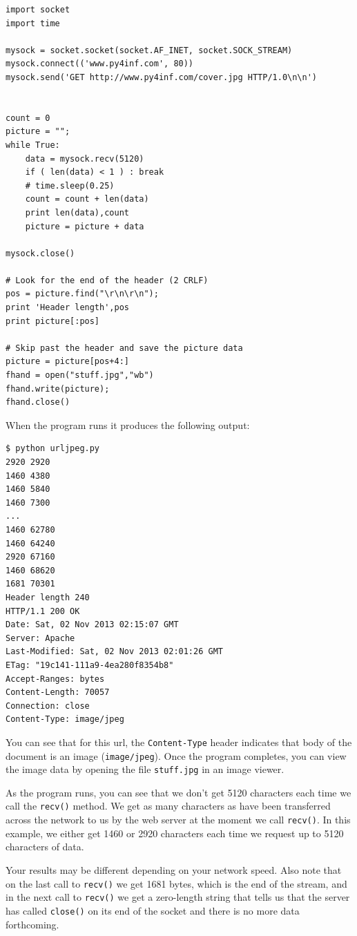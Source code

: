 \beforeverb
\begin{verbatim}
import socket
import time

mysock = socket.socket(socket.AF_INET, socket.SOCK_STREAM)
mysock.connect(('www.py4inf.com', 80))
mysock.send('GET http://www.py4inf.com/cover.jpg HTTP/1.0\n\n')


count = 0
picture = "";
while True:
    data = mysock.recv(5120)
    if ( len(data) < 1 ) : break
    # time.sleep(0.25)
    count = count + len(data)
    print len(data),count
    picture = picture + data

mysock.close()

# Look for the end of the header (2 CRLF)
pos = picture.find("\r\n\r\n");
print 'Header length',pos
print picture[:pos]

# Skip past the header and save the picture data
picture = picture[pos+4:]
fhand = open("stuff.jpg","wb")
fhand.write(picture);
fhand.close()
\end{verbatim}
\afterverb
%
When the program runs it produces the following output:

\beforeverb
\begin{verbatim}
$ python urljpeg.py 
2920 2920
1460 4380
1460 5840
1460 7300
...
1460 62780
1460 64240
2920 67160
1460 68620
1681 70301
Header length 240
HTTP/1.1 200 OK
Date: Sat, 02 Nov 2013 02:15:07 GMT
Server: Apache
Last-Modified: Sat, 02 Nov 2013 02:01:26 GMT
ETag: "19c141-111a9-4ea280f8354b8"
Accept-Ranges: bytes
Content-Length: 70057
Connection: close
Content-Type: image/jpeg
\end{verbatim}
\afterverb
%
You can see that for this url, the 
{\tt Content-Type} header indicates that
body of the document is an image ({\tt image/jpeg}).
Once the program completes, you can view the image data by opening
the file {\tt stuff.jpg} in an image viewer.

As the program runs, you can see that we don't get 5120 characters
each time we call the {\tt recv()} method.
We get as many characters as have been transferred across the network 
to us by the web server at the moment we call {\tt recv()}.  
In this example, we either get 1460 or 2920 characters each time we
request up to 5120 characters of data.

Your results may be different depending on your network speed.  Also
note that on the last call to {\tt recv()} we get 1681 bytes, which is the end
of the stream, and in the next call to {\tt recv()} we get a zero-length
string that tells us that the server has called {\tt close()} on its end 
of the socket and there is no more data forthcoming.

